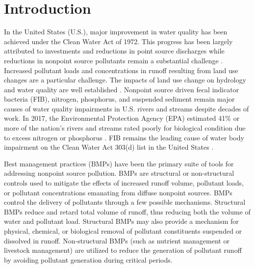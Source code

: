 \documentclass[utf8]{FrontiersinHarvard}
\begin{document}
\hypertarget{introduction}{%
\section{Introduction}\label{introduction}}

In the United States (U.S.), major improvement in water quality has been achieved under the Clean Water Act of 1972.
This progress has been largely attributed to investments and reductions in point source discharges while reductions in nonpoint source pollutants remain a substantial challenge \citep{nationalresearchcouncilAssessingTMDLApproach2001, benhamLessonsLearnedTMDL2008, schrammTotalMaximumDaily2022}.
Increased pollutant loads and concentrations in runoff resulting from land use changes are a particular challenge.
The impacts of land use change on hydrology and water quality are well established \citep{allanLandscapesRiverscapesInfluence2004, carpenterNonpointPollutionSurface1998, bernhardtUnderstandingManagingMinimizing2008, careyEvaluatingNutrientImpacts2013, freemanImpactsUrbanizationDevelopment2019}.
Nonpoint source driven fecal indicator bacteria (FIB), nitrogen, phosphorus, and suspended sediment remain major causes of water quality impairments in U.S. rivers and streams despite decades of work.
In 2017, the Environmental Protection Agency (EPA) estimated 41\% or more of the nation's rivers and streams rated poorly for biological condition due to excess nitrogen or phosphorus \citep{epaNationalWaterQuality2017}.
FIB remains the leading cause of water body impairment on the Clean Water Act 303(d) list in the United States \citep{epaNationalWaterQuality2017}.

Best management practices (BMPs) have been the primary suite of tools for addressing nonpoint source pollution.
BMPs are structural or non-structural controls used to mitigate the effects of increased runoff volume, pollutant loads, or pollutant concentrations emanating from diffuse nonpoint sources.
BMPs control the delivery of pollutants through a few possible mechanisms.
Structural BMPs reduce and retard total volume of runoff, thus reducing both the volume of water and pollutant load.
Structural BMPs may also provide a mechanism for physical, chemical, or biological removal of pollutant constituents suspended or dissolved in runoff.
Non-structural BMPs (such as nutrient management or livestock management) are utilized to reduce the generation of pollutant runoff by avoiding pollutant generation during critical periods.
\end{document}
